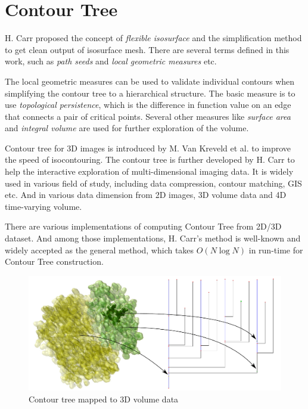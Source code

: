 \documentclass[11pt, b5paper]{report}
\begin{document}
\section{Contour Tree}
H. Carr proposed the concept of \emph{flexible isosurface}
\cite{carr2010flexible} and the simplification method to get clean output 
of isosurface mesh. There are several terms defined in this work, such 
as \emph{path seeds} and \emph{local geometric measures} etc.

The local geometric measures can be used to validate individual contours when 
simplifying the contour tree to a hierarchical structure. The basic measure
is to use \emph{topological persistence}, which is the difference in function
value on an edge that connects a pair of critical points. Several other
measures like \emph{surface area} and \emph{integral volume} are used for 
further exploration of the volume.

Contour tree for 3D images is 
introduced by M. Van Kreveld et al.\cite{van1997contour} to improve the speed
of isocontouring. The contour tree is further developed by H. Carr
\cite{carr2000computing} to help the interactive exploration of 
multi-dimensional imaging data.
It is widely used in various field of study, including 
data compression, contour matching\cite{sohn2006time}, GIS etc.
And in various data dimension from 2D images, 3D volume data and 4D 
time-varying volume.

There are various implementations of computing Contour Tree from 2D/3D 
dataset. And among those implementations, H. Carr's method is well-known and 
widely accepted as the general method, which takes $O(N\log N)$ in run-time 
for Contour Tree construction.

\begin{figure}[h!]
  \centering
  \includegraphics[width=\textwidth-1in]{images/topo-match.pdf}
  \caption{Contour tree mapped to 3D volume data}
  \label{fig:contree-map}
\end{figure}
\end{document}
